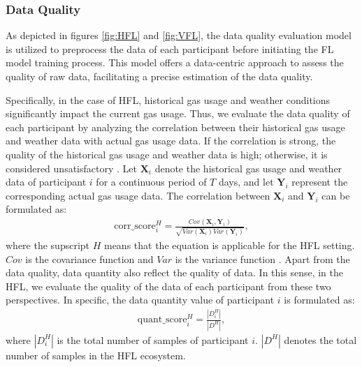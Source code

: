 \documentclass{article}
\newcommand{\note}[1]{\textbf{\color{red}[***** #1 *****]}}
\begin{document}
\subsubsection{Data Quality}
As depicted in figures \ref{fig:HFL} and \ref{fig:VFL}, the data quality evaluation model is utilized to preprocess the data of each participant before initiating the FL model training process. This model offers a data-centric approach to assess the quality of raw data, facilitating a precise estimation of the data quality.

Specifically, in the case of HFL, historical gas usage and weather conditions significantly impact the current gas usage. Thus, we evaluate the data quality of each participant by analyzing the correlation between their historical gas usage and weather data with actual gas usage data. If the correlation is strong, the quality of the historical gas usage and weather data is high; otherwise, it is considered unsatisfactory \cite{tahmasebi2012multiple}. Let $\mathbf{X}_i$ denote the historical gas usage and weather data of participant $i$ for a continuous period of $T$ days, and let $\mathbf{Y}_i$ represent the corresponding actual gas usage data. The correlation between $\mathbf{X}_i$ and $\mathbf{Y}_i$ can be formulated as:
\begin{equation}
\label{eq:data_correlation_hfl}
\begin{aligned}
\text{corr\_score}_i^H  = \frac{Cov(\mathbf{X}_i, \mathbf{Y}_i)}{\sqrt{Var(\mathbf{X}_i)Var(\mathbf{Y}_i)}},
\end{aligned}
\end{equation}
where the supscript $H$ means that the equation is applicable for the HFL setting. $Cov$ is the covariance function \cite{rice2006mathematical} and $Var$ is the variance function \cite{breiman2001random}.
Apart from the data quality, data quantity also reflect the quality of data. In this sense, in the HFL, we evaluate the quality of the data of each participant from these two perspectives. 
In specific, the data quantity value of participant $i$ is formulated as:
\begin{equation}
\label{eq:data_quantity_hfl}
\begin{aligned}
\text{quant\_score}_i^H = \frac{|D_i^H|}{|D^H|},
\end{aligned}
\end{equation}
where $|D_i^H|$ is the total number of samples of participant $i$. $|D^H|$ denotes the total number of samples in the HFL ecosystem. 
\end{document}
